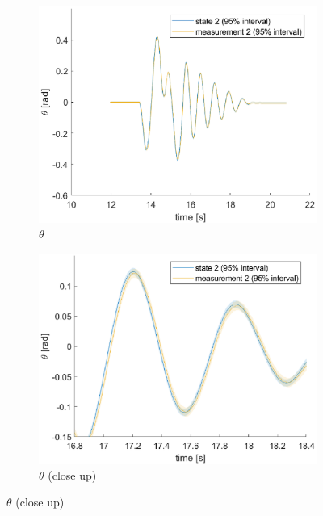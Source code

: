 \documentclass[a4paper,kul]{kulakarticle} %
\begin{document}
\begin{figure}[htp!]
\begin{subfigure}[b]{0.48\textwidth}
		\includegraphics[width=\textwidth]{state2_ext.eps}
		\caption{$\theta$}
	\end{subfigure}
	\hfill
	\begin{subfigure}[b]{0.48\textwidth}  
		\centering 
		\includegraphics[width=\textwidth]{state2_closeup_ext.eps}
		\caption{$\theta$ (close up)}
	\end{subfigure}
	

\end{figure}
\end{document}
